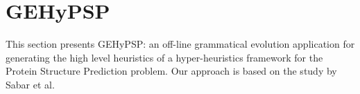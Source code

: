 \documentclass[conference]{IEEEtran}
\begin{document}
%
%
%
%
%	
%	 
% 
%	
%
%	
%


\section{GEHyPSP}
\label{sec:methodology}
This section presents GEHyPSP: an off-line grammatical evolution application for generating the high level heuristics of a hyper-heuristics framework for the Protein Structure Prediction problem. Our approach is based on the study by Sabar et al. \cite{sabar2012grammatical}
\end{document}
